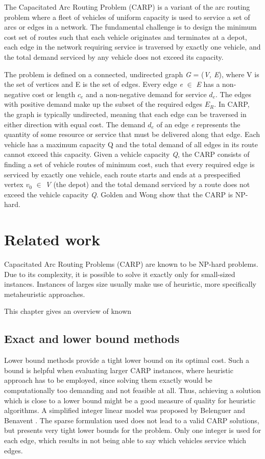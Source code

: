 \documentclass[twoside]{ctuthesis}
\theoremstyle{plain}
\theoremstyle{definition}
\theoremstyle{note}
\begin{document}
The Capacitated Arc Routing Problem (CARP) is a variant of the arc routing problem where a fleet of vehicles of uniform capacity is used to service a set of arcs or edges in a network. The fundamental challenge is to design the minimum cost set of routes such that each vehicle originates and terminates at a depot, each edge in the network requiring service is traversed by exactly one vehicle, and the total demand serviced by any vehicle does not exceed its capacity.

The problem is defined on a connected, undirected graph \emph{G} = (\emph{V, E}), where V is the set of vertices and E is the set of edges. Every edge \emph{e} $\in$ \emph{E} has a non-negative cost or length \emph{$ c_e $} and a non-negative demand for service \emph{$ d_e $}. The edges with positive demand make up the subset of the required edges \emph{$ E_R $}. In CARP, the graph is typically undirected, meaning that each edge can be traversed in either direction with equal cost. 
The demand \emph{$ d_e $} of an edge \emph{e} represents the quantity of some resource or service that must be delivered along that edge. Each vehicle has a maximum capacity Q and the total demand of all edges in its route cannot exceed this capacity.
Given a vehicle capacity \emph{Q}, the CARP consists
of finding a set of vehicle routes of minimum cost,
such that every required edge is serviced by exactly
one vehicle, each route starts and ends at a prespecified vertex \emph{$ v_0 $} $\in$ \emph{V} (the depot) and the total
demand serviced by a route does not exceed the
vehicle capacity \emph{Q}. Golden and Wong \cite{golden1981capacitated} show that the CARP is NP-hard. 


\chapter{Related work}
Capacitated Arc Routing Problems (CARP) are known to be NP-hard problems. Due to its complexity, it is possible to solve it exactly only for small-sized instances. Instances of larges size usually make use of heuristic, more specifically metaheuristic approaches.

This chapter gives an overview of known 

\section{Exact and lower bound methods}
Lower bound methods provide a tight lower bound on its optimal cost. Such a bound is helpful when evaluating larger CARP instances, where heuristic approach has to be employed, since solving them exactly would be computationally too demanding and not feasible at all. Thus, achieving a solution which is close to a lower bound might be a good measure of quality for heuristic algorithms.
A simplified integer linear model was proposed by Belenguer and Benavent \cite{BELENGUER2003705}. The sparse formulation used does not lead to a valid CARP solutions, but presents very tight lower bounds for the problem. Only one integer is used for each edge, which results in not being able to say which vehicles service which edges.
\end{document}

